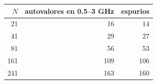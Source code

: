 \begin{tabular}{rrr}
\toprule
$N$ & autovalores en 0.5--3 GHz & espurios \\
\midrule
21 & 16 & 14 \\
41 & 29 & 27 \\
81 & 56 & 53 \\
161 & 109 & 106 \\
241 & 163 & 160 \\
\bottomrule
\end{tabular}
